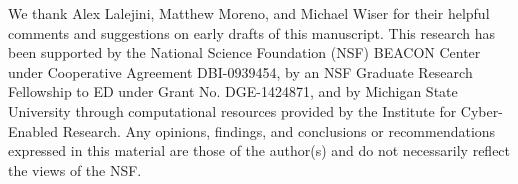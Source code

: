 \begin{acks}
We thank Alex Lalejini, Matthew Moreno, and Michael Wiser for their helpful comments and suggestions on early drafts of this manuscript. This research has been supported by the National Science Foundation (NSF) BEACON Center under Cooperative Agreement DBI-0939454, by an NSF Graduate Research Fellowship to ED under Grant No. DGE-1424871, and by Michigan State University through computational resources provided by the Institute for Cyber-Enabled Research. Any opinions, findings, and conclusions or recommendations expressed in this material are those of the author(s) and do not necessarily reflect the views of the NSF.
\end{acks}





